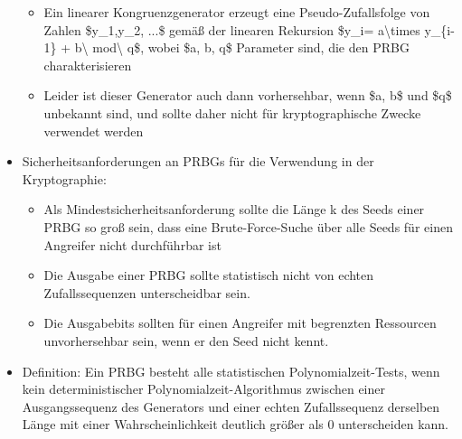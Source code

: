 \documentclass[a4paper]{article}
\begin{document}
\begin{multicols}{3}
\begin{itemize}
              \begin{itemize}
                  \item
                        Ein linearer Kongruenzgenerator erzeugt eine Pseudo-Zufallsfolge von
                        Zahlen \$y\_1,y\_2, ...\$ gemäß der linearen Rekursion \$y\_i=
                        a\textbackslash times y\_\{i-1\} + b\textbackslash{}
                        mod\textbackslash{} q\$, wobei \$a, b, q\$ Parameter sind, die den
                        PRBG charakterisieren
                  \item
                        Leider ist dieser Generator auch dann vorhersehbar, wenn \$a, b\$
                        und \$q\$ unbekannt sind, und sollte daher nicht für
                        kryptographische Zwecke verwendet werden
              \end{itemize}
        \item
              Sicherheitsanforderungen an PRBGs für die Verwendung in der
              Kryptographie:

              \begin{itemize}
                  \item
                        Als Mindestsicherheitsanforderung sollte die Länge k des Seeds einer
                        PRBG so groß sein, dass eine Brute-Force-Suche über alle Seeds für
                        einen Angreifer nicht durchführbar ist
                  \item
                        Die Ausgabe einer PRBG sollte statistisch nicht von echten
                        Zufallssequenzen unterscheidbar sein.
                  \item
                        Die Ausgabebits sollten für einen Angreifer mit begrenzten
                        Ressourcen unvorhersehbar sein, wenn er den Seed nicht kennt.
              \end{itemize}
        \item
              Definition: Ein PRBG besteht alle statistischen Polynomialzeit-Tests,
              wenn kein deterministischer Polynomialzeit-Algorithmus zwischen einer
              Ausgangssequenz des Generators und einer echten Zufallssequenz
              derselben Länge mit einer Wahrscheinlichkeit deutlich größer als 0
              unterscheiden kann.


\end{itemize}
\end{multicols}
\end{document}
